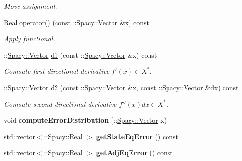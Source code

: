 \begin{DoxyCompactItemize}
\begin{DoxyCompactList}\small\item\em Move assignment. \end{DoxyCompactList}\item 
\hyperlink{classSpacy_1_1Real}{Real} \hyperlink{classSpacy_1_1KaskadeParabolic_1_1C2Functional_ae1a74fd38f93e9a46b5df1a21156c622}{operator()} (const \-::\hyperlink{classSpacy_1_1Vector}{Spacy\-::\-Vector} \&x) const 
\begin{DoxyCompactList}\small\item\em Apply functional. \end{DoxyCompactList}\item 
\-::\hyperlink{classSpacy_1_1Vector}{Spacy\-::\-Vector} \hyperlink{classSpacy_1_1KaskadeParabolic_1_1C2Functional_a0998b1599ea0372add52e2b4970a2fee}{d1} (const \-::\hyperlink{classSpacy_1_1Vector}{Spacy\-::\-Vector} \&x) const 
\begin{DoxyCompactList}\small\item\em Compute first directional derivative $f'(x) \in X^* $. \end{DoxyCompactList}\item 
\-::\hyperlink{classSpacy_1_1Vector}{Spacy\-::\-Vector} \hyperlink{classSpacy_1_1KaskadeParabolic_1_1C2Functional_afade29355a299b102c85596b9dd97636}{d2} (const \-::\hyperlink{classSpacy_1_1Vector}{Spacy\-::\-Vector} \&x, const \-::\hyperlink{classSpacy_1_1Vector}{Spacy\-::\-Vector} \&dx) const 
\begin{DoxyCompactList}\small\item\em Compute second directional derivative $f''(x)dx\in X^* $. \end{DoxyCompactList}\item 
\hypertarget{classSpacy_1_1KaskadeParabolic_1_1C2Functional_ae70fa3f996517212fdccdba821a23353}{void {\bfseries compute\-Error\-Distribution} (\-::\hyperlink{classSpacy_1_1Vector}{Spacy\-::\-Vector} x)}\label{classSpacy_1_1KaskadeParabolic_1_1C2Functional_ae70fa3f996517212fdccdba821a23353}

\item 
\hypertarget{classSpacy_1_1KaskadeParabolic_1_1C2Functional_a85b573a942f8c44aff0e7ffbc7c97ca9}{std\-::vector$<$\-::\hyperlink{classSpacy_1_1Real}{Spacy\-::\-Real} $>$ {\bfseries get\-State\-Eq\-Error} () const }\label{classSpacy_1_1KaskadeParabolic_1_1C2Functional_a85b573a942f8c44aff0e7ffbc7c97ca9}

\item 
\hypertarget{classSpacy_1_1KaskadeParabolic_1_1C2Functional_af1271ba0540b2f19bb40bdbd1786dc29}{std\-::vector$<$\-::\hyperlink{classSpacy_1_1Real}{Spacy\-::\-Real} $>$ {\bfseries get\-Adj\-Eq\-Error} () const }\label{classSpacy_1_1KaskadeParabolic_1_1C2Functional_af1271ba0540b2f19bb40bdbd1786dc29}


\end{DoxyCompactItemize}
